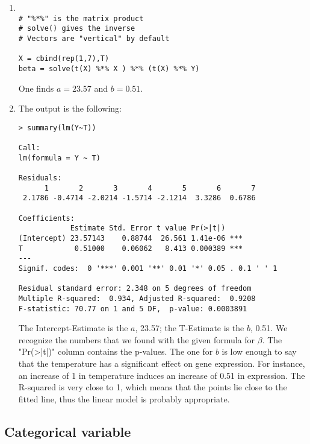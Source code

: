 \documentclass[a4paper,11pt]{article}
\begin{document}
\begin{enumerate}
\item
\begin{verbatim}

# "%*%" is the matrix product
# solve() gives the inverse
# Vectors are "vertical" by default

X = cbind(rep(1,7),T)
beta = solve(t(X) %*% X ) %*% (t(X) %*% Y)
\end{verbatim}
One finds $a=23.57$ and $b=0.51$.

\item The output is the following:
\begin{verbatim}
> summary(lm(Y~T))

Call:
lm(formula = Y ~ T)

Residuals:
      1       2       3       4       5       6       7
 2.1786 -0.4714 -2.0214 -1.5714 -2.1214  3.3286  0.6786

Coefficients:
            Estimate Std. Error t value Pr(>|t|)
(Intercept) 23.57143    0.88744  26.561 1.41e-06 ***
T            0.51000    0.06062   8.413 0.000389 ***
---
Signif. codes:  0 '***' 0.001 '**' 0.01 '*' 0.05 . 0.1 ' ' 1

Residual standard error: 2.348 on 5 degrees of freedom
Multiple R-squared:  0.934,	Adjusted R-squared:  0.9208
F-statistic: 70.77 on 1 and 5 DF,  p-value: 0.0003891
\end{verbatim}

The Intercept-Estimate is the $a$, 23.57; the T-Estimate is the $b$, 0.51. 
We recognize the numbers that we found with the given formula for $\beta$.
The "Pr(>|t|)" column contains the p-values. The one for $b$ is low enough to say that the temperature 
has a significant effect on gene expression. For instance, an increase of 1 in temperature induces an increase 
of 0.51 in expression. The R-squared is very close to 1, which means that the points lie close
to the fitted line, thus the linear model is probably appropriate.

\end{enumerate}

\subsection{Categorical variable}
\end{document}
